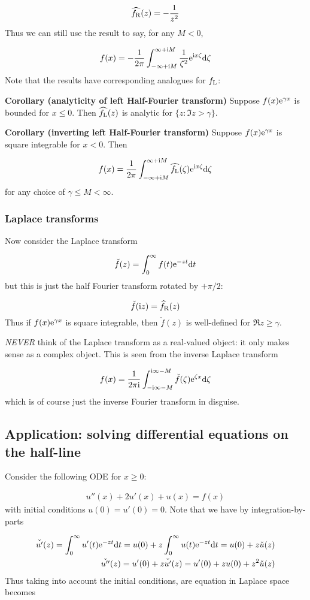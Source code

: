 \documentclass[12pt,a4paper]{article}
\def\D{ {\rm d} }
\def\I{ {\rm i} }
\def\E{ {\rm e} }
\def\fR{ f_{\rm R} }
\def\fL{ f_{\rm L} }
\def\dt{\D t}
\begin{document}
\[
\widehat{\fR}(z) = -{1 \over z^2}
\]
Thus we can still use the result to say, for any $M < 0$,

\[
f(x) =-{1 \over 2 \pi} \int_{-\infty+\I M}^{\infty +\I M} {1 \over \zeta^2} \E^{\I x \zeta}\D \zeta
\]
Note that the results have corresponding analogues for $\fL$:

\textbf{Corollary (analyticity of left Half-Fourier transform)} Suppose $f(x) \E^{\gamma x}$  is bounded for $x \leq 0$. Then $\widehat{\fL}(z)$ is analytic for $\{z : \Im z > \gamma \}$.

\textbf{Corollary  (inverting left Half-Fourier transform)} Suppose $f(x) \E^{\gamma x}$ is square integrable for $x < 0$. Then

\[
f(x) = {1 \over 2 \pi} \int_{-\infty + \I M}^{\infty + \I M} \widehat{\fL}(\zeta) \E^{\I x \zeta} \D \zeta
\]
for any choice of $\gamma \leq M < \infty$.

\subsubsection{Laplace transforms}
Now consider the Laplace transform

\[
\check f(z) = \int_0^\infty f(t) \E^{-z t} \dt
\]
but this is just the half Fourier transform rotated by $+\pi/2$:

\[
\check f(\I z) = \widehat\fR (z)
\]
Thus if $f(x) \E^{\gamma x}$ is square integrable, then $\check f(z)$ is well-defined for $\Re z \geq \gamma$.

\emph{NEVER} think of the Laplace transform as a real-valued object: it only makes sense as a complex object. This is seen from the inverse Laplace transform

\[
f(x) = {1 \over 2 \pi \I} \int_{-\I \infty - M}^{\I \infty - M}  \check f(\zeta) \E^{\zeta x} \D \zeta
\]
which is of course just the inverse Fourier transform in disguise.

\subsection{Application: solving differential equations on the half-line}
Consider the following ODE for $x \geq 0$:


\begin{align*}
u''(x) + 2u'(x) + u(x) = f(x)
\end{align*}
with initial conditions $u(0) = u'(0) = 0$. Note that we have by integration-by-parts


\begin{align*}
\check{u'}(z) = \int_0^\infty u'(t) \E^{-z t} \dt = u(0) + z \int_0^\infty u(t) \E^{-z t} \dt = u(0) + z \check u(z) \\
\check{u''}(z) = u'(0) + z \check{u'}(z) = u'(0) + z u(0) + z^2 \check u(z)
\end{align*}
Thus taking into account the initial conditions, are equation in Laplace space becomes
\end{document}
